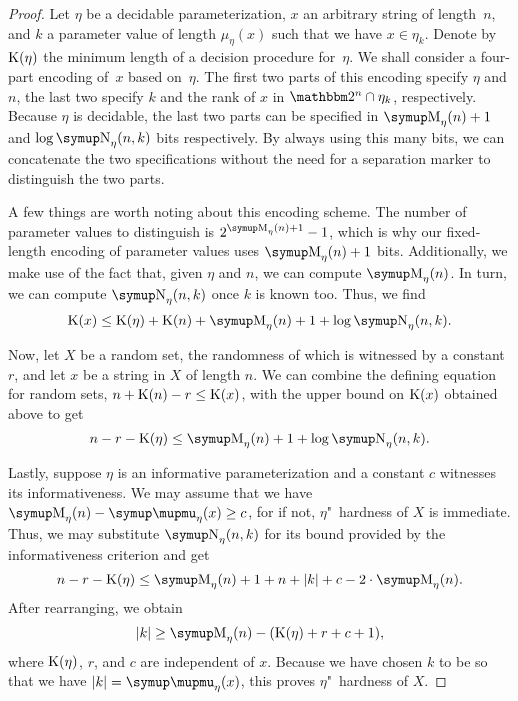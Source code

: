 \begin{proof}
  Let $\eta$ be a decidable parameterization, $x$ an arbitrary string of length~$n$, and $k$ a parameter value of length $\mu_\eta(x)$ such that we have $x \in \eta_k$.
  Denote by $\operatorname{K}(\eta)$ the minimum length of a decision procedure for~$\eta$.
  We shall consider a four-part encoding of~$x$ based on~$\eta$.
  The first two parts of this encoding specify $\eta$ and $n$, the last two specify $k$ and the rank of $x$ in $\binary^n \cap \eta_k$, respectively.
  Because $\eta$ is decidable, the last two parts can be specified in $\upM_\eta(n) + 1$ and $\log \upN_\eta(n, k)$ bits respectively.
  By always using this many bits, we can concatenate the two specifications without the need for a separation marker to distinguish the two parts.

  A few things are worth noting about this encoding scheme.
  The number of parameter values to distinguish is $2^{\upM_\eta(n) + 1} - 1$, which is why our fixed-length encoding of parameter values uses $\upM_\eta(n) + 1$ bits.
  Additionally, we make use of the fact that, given $\eta$ and $n$, we can compute $\upM_\eta(n)$.
  In turn, we can compute $\upN_\eta(n, k)$ once $k$ is known too.
  Thus, we find
  \begin{equation*}
    \KC(x) \le \KC(\eta) + \KC(n) + \upM_\eta(n) + 1 + \log \upN_\eta(n, k).
  \end{equation*}

  Now, let $X$ be a random set, the randomness of which is witnessed by a constant $r$, and let $x$ be a string in $X$ of length $n$.
  We can combine the defining equation for random sets, $n + \operatorname{K}(n) - r \le \operatorname{K}(x)$, with the upper bound on $\operatorname{K}(x)$ obtained above to get
  \begin{equation*}
    n - r - \KC(\eta) \le \upM_\eta(n) + 1+ \log \upN_\eta(n, k).
  \end{equation*}

  Lastly, suppose $\eta$ is an informative parameterization and a constant $c$ witnesses its informativeness.
  We may assume that we have $\upM_\eta(n) - \mu_\eta(x) \ge c$, for if not, $\eta$"~hardness of $X$ is immediate.
  Thus, we may substitute $\upN_\eta(n, k)$ for its bound provided by the informativeness criterion and get
  \begin{equation*}
    n - r - \KC(\eta) \le \upM_\eta(n) + 1 + n + \length{k} + c - 2 \cdot \upM_\eta(n).
  \end{equation*}
  After rearranging, we obtain
  \begin{equation*}
    \length{k} \ge \upM_\eta(n) - (\KC(\eta) + r + c + 1),
  \end{equation*}
  where $\operatorname{K}(\eta)$, $r$, and $c$ are independent of $x$.
  Because we have chosen $k$ to be so that we have $\length{k} = \mu_\eta(x)$, this proves $\eta$"~hardness of $X$.
\end{proof}

